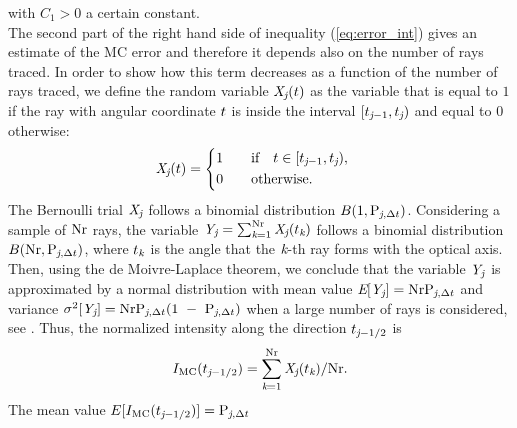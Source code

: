 with $C_1>0$ a certain constant. \\
\indent
The second part of the right hand side of inequality (\ref{eq:error_int}) gives an estimate of the MC error and therefore it depends also on the
number of rays traced.
In order to show how this term decreases as a function of the number of rays traced,
we define the random variable $\textit{X}_{\textit{j}}(t)$ as the variable that is equal to $1$ if the ray with angular coordinate $t$
is inside the interval $[t_{\textit{j}-1}, t_{\textit{j}})$ and equal to $0$ otherwise:
\begin{equation}
\label{radom_variable}
\textit{X}_{\textit{j}}(t) = \begin{cases} \begin{aligned}
1& \qquad \mbox{if} \quad t\in [t_{\textit{j}-1}, t_{\textit{j}}),\\
0 & \qquad \mbox{otherwise}.
\end{aligned}\end{cases}
\end{equation}
The Bernoulli trial $ \textit{X}_{\textit{j}}$ follows a binomial distribution $B(1,\textrm{P}_{\textit{j}, \Delta t})$.
Considering a sample of $\textrm{Nr}$ rays, the variable $\textit{Y}_{\textit{j}} = \sum_{\textit{k}=1}^{\textrm{Nr}} \textit{X}_{\textit{j}}(t_{\textit{k}})$
follows a binomial distribution $B(\textrm{Nr}, \textrm{P}_{\textit{j},\Delta t})$, where $t_{\textit{k}}$ is the angle that the $\textit{k}$-th ray forms
 with the optical axis. Then, using the de Moivre-Laplace theorem, we conclude that the variable $\textit{Y}_{\textit{j}}$ is approximated by a normal distribution with mean value
$\textit{E}[\textit{Y}_{\textit{j}}] = \textrm{Nr}\textrm{P}_{\textit{j}, \Delta t}$ and variance $\sigma^2[\textit{Y}_{\textit{j}}] = \textrm{Nr}\textrm{P}_{\textit{j}, \Delta t}(1~-~\textrm{P}_{\textit{j}, \Delta t})$
when a large number of rays is considered, see \cite{zolotarev1997modern, rubinstein2016simulation}.
Thus, the normalized intensity along the direction $t_{\textit{j}-1/2}$ is
\begin{equation}I_{\textrm{MC}}(t_{\textit{j}-1/2}) = \sum_{\textit{k}=1}^{\textrm{Nr}}\textit{X}_{\textit{j}}(t_{\textit{k}})/\textrm{Nr}.\end{equation}
The mean value $E[I_{\textrm{MC}}(t_{\textit{j}-1/2})]=\textrm{P}_{\textit{j}, \Delta t}$
